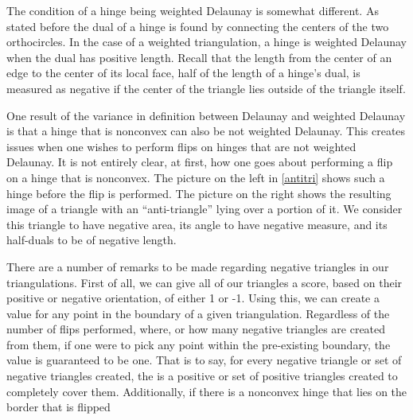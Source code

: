 \documentclass[12pt]{article}
\begin{document}
\noindent The condition of a hinge being weighted Delaunay is somewhat different. As stated before the dual of a hinge is found by connecting the centers of the two orthocircles. In the case of a weighted triangulation, a hinge is weighted Delaunay when the dual has positive length. Recall that the length from the center of an edge to the center of its local face, half of the length of a hinge's dual, is measured as negative if the center of the triangle lies outside of the triangle itself.\newline

\noindent One result of the variance in definition between Delaunay and weighted Delaunay is that a hinge that is nonconvex can also be not weighted Delaunay. This creates issues when one wishes to perform flips on hinges that are not weighted Delaunay. It is not entirely clear, at first, how one goes about performing a flip on a hinge that is nonconvex. The picture on the left in \ref{antitri} shows such a hinge before the flip is performed. The picture on the right shows the resulting image of a triangle with an ``anti-triangle'' lying over a portion of it. We consider this triangle to have negative area, its angle to have negative measure, and its half-duals to be of negative length.\newline

\noindent There are a number of remarks to be made regarding negative triangles in our triangulations. First of all, we can give all of our triangles a score, based on their positive or negative orientation, of either 1 or -1. Using this, we can create a value for any point in the boundary of a given triangulation. Regardless of the number of flips performed, where, or how many negative triangles are created from them, if one were to pick any point within the pre-existing boundary, the value is guaranteed to be one. That is to say, for every negative triangle or set of negative triangles created, the is a positive or set of positive triangles created to completely cover them. Additionally, if there is a nonconvex hinge that lies on the border that is flipped
\end{document}
